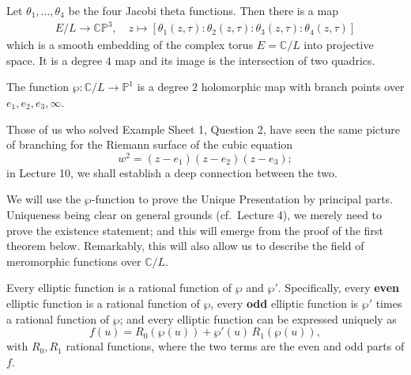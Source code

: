 \documentclass[12pt]{article}
\begin{document}
\begin{theorem}
    Let $\theta_1,\dots,\theta_4$ be the four Jacobi theta functions. Then there is a map \begin{align*}
        E/L \to \mathbb{CP}^3, \quad z \mapsto [\theta_1(z,\tau):\theta_2(z,\tau):\theta_3(z,\tau):\theta_4(z,\tau)]
    \end{align*} which is a smooth embedding of the complex torus $E=\mathbb{C}/L$ into projective space. It is a degree $4$ map and its image is the intersection of two quadrics.
\end{theorem}

\begin{proposition}
The function $\wp : \mathbb{C}/L \to \mathbb{P}^1$ is a degree $2$ holomorphic map with branch points over 
$e_1, e_2, e_3, \infty$.
\end{proposition}

Those of us who solved Example Sheet 1, Question 2, have seen the same picture of branching 
for the Riemann surface of the cubic equation
\[
    w^2 = (z - e_1)(z - e_2)(z - e_3);
\]
in Lecture 10, we shall establish a deep connection between the two.

We will use the $\wp$-function to prove the Unique Presentation by principal parts.
Uniqueness being clear on general grounds (cf.\ Lecture 4), we merely need to prove the existence statement;
and this will emerge from the proof of the first theorem below. 
Remarkably, this will also allow us to describe the field of meromorphic functions over $\mathbb{C}/L$.

\begin{theorem}
Every elliptic function is a rational function of $\wp$ and $\wp'$. 
Specifically, every \textbf{even} elliptic function is a rational function of $\wp$, 
every \textbf{odd} elliptic function is $\wp'$ times a rational function of $\wp$;
and every elliptic function can be expressed uniquely as
\[
    f(u) = R_0(\wp(u)) + \wp'(u)\, R_1(\wp(u)),
\]
with $R_0, R_1$ rational functions, where the two terms are the even and odd parts of $f$.
\end{theorem}
\end{document}
